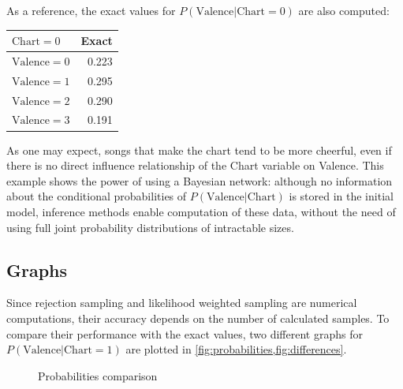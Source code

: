\documentclass[a4paper, 12pt]{article}
\begin{document}
As a reference, the exact values for $P\left(\mathrm{Valence} | \mathrm{Chart} = 0\right)$ are also computed:
\begin{center}
    \begin{tabular}{lr}
        \toprule
        $\mathrm{Chart} = 0$   & Exact \\
        \midrule
        $\mathrm{Valence} = 0$ & 0.223 \\
        $\mathrm{Valence} = 1$ & 0.295 \\
        $\mathrm{Valence} = 2$ & 0.290 \\
        $\mathrm{Valence} = 3$ & 0.191 \\
        \bottomrule
    \end{tabular}
\end{center}

As one may expect, songs that make the chart tend to be more cheerful, even if there is no direct influence relationship of the Chart variable on Valence. This example shows the power of using a Bayesian network: although no information about the conditional probabilities of $P\left(\mathrm{Valence} | \mathrm{Chart}\right)$ is stored in the initial model, inference methods enable computation of these data, without the need of using full joint probability distributions of intractable sizes.


\subsection{Graphs}

Since rejection sampling and likelihood weighted sampling are numerical computations, their accuracy depends on the number of calculated samples. To compare their performance with the exact values, two different graphs for $P\left(\mathrm{Valence} | \mathrm{Chart} = 1\right)$ are plotted in \cref{fig:probabilities,fig:differences}.

\begin{figure}
    \centering
    \caption{Probabilities comparison}
    \label{fig:probabilities}
\end{figure}
\end{document}
